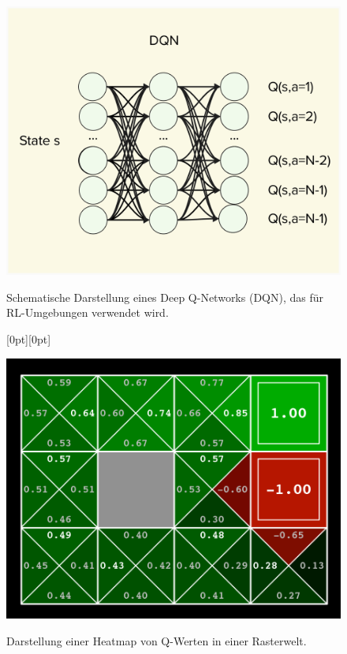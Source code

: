 \begin{figure}[htbp]
		\centering
		\begin{minipage}[b]{0.48\linewidth}
				\includegraphics[width=\linewidth]{2Grundlagen/33grid_world_q_learning.png}
				\caption{Schematische Darstellung eines Deep Q-Networks (DQN), das für RL-Umgebungen verwendet wird.}
				\label{fig:dqn}
		\end{minipage}
		\hfill %
		\raisebox{1pt}[0pt][0pt]{%
				\begin{minipage}[b]{0.48\linewidth}
						\includegraphics[width=\linewidth]{2Grundlagen/33Q_Values.png}
						\caption{Darstellung einer Heatmap von Q-Werten in einer Rasterwelt.}
						\label{fig:grid_world_q_learning}
						\cite{klein_abbeel_cs188}
				\end{minipage}%
				}
\end{figure}

